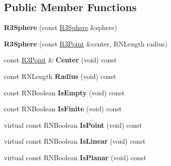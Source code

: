 \subsection*{Public Member Functions}
\begin{DoxyCompactItemize}
\item 
{\bfseries R3\+Sphere} (const \hyperlink{class_r3_sphere}{R3\+Sphere} \&sphere)\hypertarget{class_r3_sphere_a74f08d961e787c07c576b7a64e6137bf}{}\label{class_r3_sphere_a74f08d961e787c07c576b7a64e6137bf}

\item 
{\bfseries R3\+Sphere} (const \hyperlink{class_r3_point}{R3\+Point} \&center, R\+N\+Length radius)\hypertarget{class_r3_sphere_afe12687419c6e731367b34dbe39137eb}{}\label{class_r3_sphere_afe12687419c6e731367b34dbe39137eb}

\item 
const \hyperlink{class_r3_point}{R3\+Point} \& {\bfseries Center} (void) const \hypertarget{class_r3_sphere_ad2b58bb0c58a81f1ca9e8e0d39287f3d}{}\label{class_r3_sphere_ad2b58bb0c58a81f1ca9e8e0d39287f3d}

\item 
const R\+N\+Length {\bfseries Radius} (void) const \hypertarget{class_r3_sphere_a704678a914c0c1762908d7d639ee973c}{}\label{class_r3_sphere_a704678a914c0c1762908d7d639ee973c}

\item 
const R\+N\+Boolean {\bfseries Is\+Empty} (void) const \hypertarget{class_r3_sphere_a4b7b1d16a1d689bd3fc4d52d98a9cbc6}{}\label{class_r3_sphere_a4b7b1d16a1d689bd3fc4d52d98a9cbc6}

\item 
const R\+N\+Boolean {\bfseries Is\+Finite} (void) const \hypertarget{class_r3_sphere_a30b6e2ce321b378257d5fe195025a6aa}{}\label{class_r3_sphere_a30b6e2ce321b378257d5fe195025a6aa}

\item 
virtual const R\+N\+Boolean {\bfseries Is\+Point} (void) const \hypertarget{class_r3_sphere_a45d13b09b5180360ac09ee96bd5d4de7}{}\label{class_r3_sphere_a45d13b09b5180360ac09ee96bd5d4de7}

\item 
virtual const R\+N\+Boolean {\bfseries Is\+Linear} (void) const \hypertarget{class_r3_sphere_af0ae99556f80eb91aaf72593f430e709}{}\label{class_r3_sphere_af0ae99556f80eb91aaf72593f430e709}

\item 
virtual const R\+N\+Boolean {\bfseries Is\+Planar} (void) const \hypertarget{class_r3_sphere_a91bae65fd321234e491ff75dae2969cb}{}\label{class_r3_sphere_a91bae65fd321234e491ff75dae2969cb}


\end{DoxyCompactItemize}
